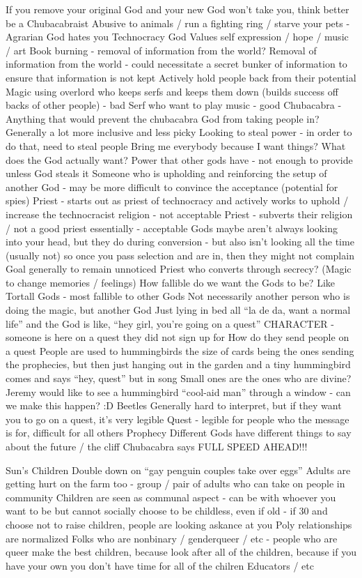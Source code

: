 \documentclass[blue]{GL2020}
\begin{document}
If you remove your original God and your new God won’t take you, think better be a Chubacabraist
Abusive to animals / run a fighting ring / starve your pets - Agrarian God hates you
Technocracy God
Values self expression / hope / music / art
Book burning - removal of information from the world?  Removal of information from the world - could necessitate a secret bunker of information to ensure that information is not kept
Actively hold people back from their potential
Magic using overlord who keeps serfs and keeps them down (builds success off backs of other people) - bad
Serf who want to play music - good
Chubacabra - Anything that would prevent the chubacabra God from taking people in?  Generally a lot more inclusive and less picky
Looking to steal power - in order to do that, need to steal people
Bring me everybody because I want things?
What does the God actually want?
Power that other gods have - not enough to provide unless God steals it
Someone who is upholding and reinforcing the setup of another God - may be more difficult to convince the acceptance (potential for spies)
Priest - starts out as priest of technocracy and actively works to uphold / increase the technocracist religion - not acceptable
Priest - subverts their religion / not a good priest essentially - acceptable
Gods maybe aren’t always looking into your head, but they do during conversion - but also isn’t looking all the time (usually not) so once you pass selection and are in, then they might not complain
Goal generally to remain unnoticed
Priest who converts through secrecy?  (Magic to change memories / feelings)
How fallible do we want the Gods to be?
Like Tortall Gods - most fallible to other Gods
Not necessarily another person who is doing the magic, but another God
Just lying in bed all “la de da, want a normal life” and the God is like, “hey girl, you’re going on a quest”
CHARACTER - someone is here on a quest they did not sign up for
How do they send people on a quest
People are used to hummingbirds the size of cards being the ones sending the prophecies, but then just hanging out in the garden and a tiny hummingbird comes and says “hey, quest” but in song
Small ones are the ones who are divine?
Jeremy would like to see a hummingbird “cool-aid man” through a window - can we make this happen? :D
Beetles
Generally hard to interpret, but if they want you to go on a quest, it’s very legible
Quest - legible for people who the message is for, difficult for all others
Prophecy
Different Gods have different things to say about the future / the cliff
Chubacabra says FULL SPEED AHEAD!!!


Sun’s Children
Double down on “gay penguin couples take over eggs”
Adults are getting hurt on the farm too - group / pair of adults who can take on people in community
Children are seen as communal aspect - can be with whoever you want to be but cannot socially choose to be childless, even if old - if 30 and choose not to raise children, people are looking askance at you
Poly relationships are normalized
Folks who are nonbinary / genderqueer / etc - people who are queer make the best children, because look after all of the children, because if you have your own you don’t have time for all of the chilren
Educators / etc
\end{document}
